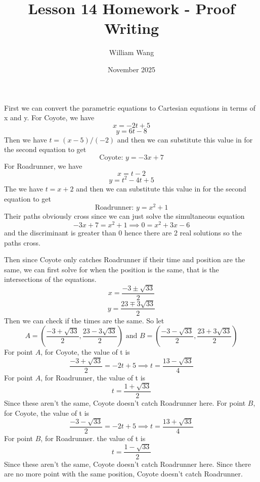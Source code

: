 \documentclass{article}
\title{Lesson 14 Homework - Proof Writing}
\author{William Wang}
\date{November 2025}
\begin{document}
\maketitle

\section{}
First we can convert the parametric equations to Cartesian equations in terms of x and y. For Coyote, we have 
\[x = -2t+5\]
\[y  = 6t-8\]
Then we have \(t = (x-5)/(-2)\) and then we can substitute this value in for the second equation to get 
\[\text{Coyote: } y = -3x+7\]
For Roadrunner, we have 
\[x = t-2\]
\[y = t^2-4t+5\]
The we have \(t = x+2\) and then we can substitute this value in for the second equation to get 
\[\text{Roadrunner: } y = x^2 +1\]
Their paths obviously cross since we can just solve the simultaneous equation 
\[-3x+7 = x^2 +1 \implies 0 = x^2 +3x-6\] and the discriminant is greater than 0 hence there are 2 real solutions so the paths cross. 

Then since Coyote only catches Roadrunner if their time and position are the same, we can      first solve for when the position is the same, that is the intersections of the equations. 
\[x = \frac{-3 \pm \sqrt{33}}{2}\]
\[y = \frac{23 \mp 3\sqrt{33}}{2}\]
Then we can check if the times are the same. So let 
\[A = (\frac{-3+\sqrt{33}}{2}, \frac{23-3\sqrt{33}}{2}) \text{ and } B = (\frac{-3-\sqrt{33}}{2}, \frac{23+3\sqrt{33}}{2})\]
For point $A$, for Coyote, the value of t is 
\[\frac{-3+\sqrt{33}}{2} = -2t+5 \implies t = \frac{13-\sqrt{33}}{4}\]
For point $A$, for Roadrunner, the value of t is
\[t = \frac{1+\sqrt{33}}{2}\]
Since these aren't the same, Coyote doesn't catch Roadrunner here. For point $B$, for Coyote, the value of t is 
\[\frac{-3-\sqrt{33}}{2} = -2t+5 \implies t = \frac{13+\sqrt{33}}{4}\]
For point $B$, for Roadrunner. the value of t is
\[t = \frac{1-\sqrt{33}}{2}\]
Since these aren't the same, Coyote doesn't catch Roadrunner here. Since there are no more point with the same position, Coyote doesn't catch Roadrunner. 
\end{document}
